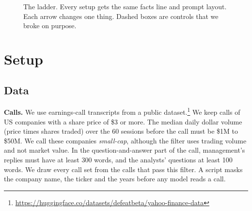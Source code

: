 \documentclass[sigconf,nonacm]{acmart}
\begin{document}
\begin{figure}[t]
\centering
{}
\caption{The ladder. Every setup gets the same facts line and prompt layout. Each arrow changes one thing. Dashed boxes are controls that we broke on purpose.}
\label{fig:ladder}
\end{figure}

\section{Setup}\label{sec:setup}

\subsection{Data}

\textbf{Calls.} We use earnings-call transcripts from a public dataset.\footnote{\url{https://huggingface.co/datasets/defeatbeta/yahoo-finance-data}}
We keep calls of US companies with a share price of \$3 or more.
The median daily dollar volume (price times shares traded) over the 60 sessions before the call must be \$1M to \$50M.
We call these companies \emph{small-cap}, although the filter uses trading volume and not market value.
In the question-and-answer part of the call, management's replies must have at least 300 words, and the analysts' questions at least 100 words.
We draw every call set from the calls that pass this filter.
A script masks the company name, the ticker and the years before any model reads a call.
\end{document}

